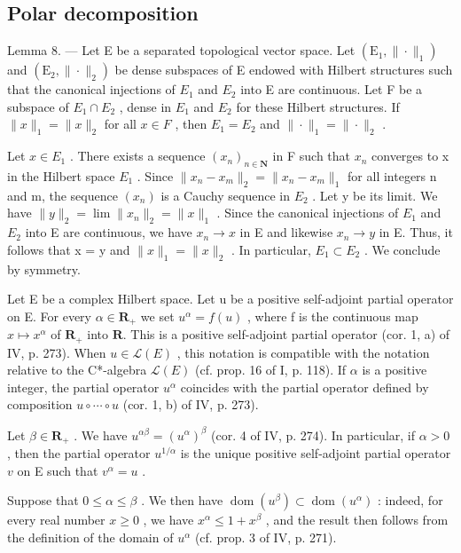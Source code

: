 \subsection{Polar decomposition}

Lemma 8. --- Let E be a separated topological vector space. Let \((\mathrm{E}_{1},\|\cdot\|_{1})\) and \((\mathrm{E}_{2},\|\cdot\|_{2})\) be dense subspaces of E endowed with Hilbert structures such that the canonical injections of \(E_{1}\) and \(E_{2}\) into E are continuous. Let F be a subspace of \(E_{1}\cap E_{2}\) , dense in \(E_{1}\) and \(E_{2}\) for these Hilbert structures. If \(\|x\|_{1}=\|x\|_{2}\) for all \(x\in F\) , then \(E_{1}=E_{2}\) and \(\|\cdot\|_{1}=\|\cdot\|_{2}\) .

Let \(x \in E_{1}\) . There exists a sequence \((x_{n})_{n \in \mathbf{N}}\) in F such that \(x_{n}\) converges to x in the Hilbert space \(E_{1}\) . Since \(\|x_{n} - x_{m}\|_{2} = \|x_{n} - x_{m}\|_{1}\) for all integers n and m, the sequence \((x_{n})\) is a Cauchy sequence in \(E_{2}\) . Let y be its limit. We have \(\|y\|_{2} = \lim\|x_{n}\|_{2} = \|x\|_{1}\) . Since the canonical injections of \(E_{1}\) and \(E_{2}\) into E are continuous, we have \(x_{n} \to x\) in E and likewise \(x_{n} \to y\) in E. Thus, it follows that x = y and \(\|x\|_{1} = \|x\|_{2}\) . In particular, \(E_{1} \subset E_{2}\) . We conclude by symmetry.

Let E be a complex Hilbert space. Let u be a positive self-adjoint partial operator on E. For every \(\alpha \in \mathbf R_{+}\) we set \(u^{\alpha} = f(u)\) , where f is the continuous map \(x \mapsto x^{\alpha}\) of \(\mathbf R_{+}\) into \(\mathbf R\). This is a positive self-adjoint partial operator (cor. 1, a) of IV, p. 273). When \(u \in \mathcal{L}(E)\) , this notation is compatible with the notation relative to the C*-algebra \(\mathcal{L}(E)\) (cf. prop. 16 of I, p. 118). If \(\alpha\) is a positive integer, the partial operator \(u^{\alpha}\) coincides with the partial operator defined by composition \(u \circ \cdots \circ u\) (cor. 1, b) of IV, p. 273).

Let \(\beta \in \mathbf{R}_{+}\) . We have \(u^{\alpha \beta} = (u^{\alpha})^{\beta}\) (cor. 4 of IV, p. 274). In particular, if \(\alpha > 0\) , then the partial operator \(u^{1 / \alpha}\) is the unique positive self-adjoint partial operator \(v\) on E such that \(v^{\alpha} = u\) .

Suppose that \(0 \leqslant \alpha \leqslant \beta\) . We then have \(\operatorname{dom}(u^{\beta}) \subset \operatorname{dom}(u^{\alpha})\) : indeed, for every real number \(x \geqslant 0\) , we have \(x^{\alpha} \leqslant 1 + x^{\beta}\) , and the result then follows from the definition of the domain of \(u^{\alpha}\) (cf. prop. 3 of IV, p. 271).

